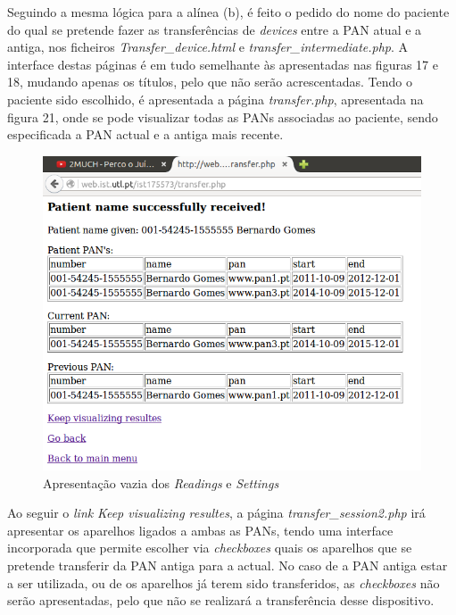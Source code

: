 \documentclass[a4paper]{article}
\begin{document}
\pagebreak
Seguindo a mesma lógica para a alínea (b), é feito o pedido do nome do paciente do qual se pretende fazer as transferências de \textit{devices} entre a PAN atual e a antiga, nos ficheiros \textit{Transfer\_device.html} e \textit{transfer\_intermediate.php}. A interface destas páginas é em tudo semelhante às apresentadas nas figuras 17 e 18, mudando apenas os títulos, pelo que não serão acrescentadas. Tendo o paciente sido escolhido, é apresentada a página \textit{transfer.php}, apresentada na figura 21, onde se pode visualizar todas as PANs associadas ao paciente, sendo especificada a PAN actual e a antiga mais recente.

\begin{figure}[ht!]
\centering
\includegraphics[scale=0.53]{transfer_php.png}
\caption{Apresentação vazia dos \textit{Readings} e \textit{Settings}}
\end{figure}
\vskip 9mm
Ao seguir o \textit{link} \textit{Keep visualizing resultes}, a página \textit{transfer\_session2.php} irá apresentar os aparelhos ligados a ambas as PANs, tendo uma interface incorporada que permite escolher via \textit{checkboxes} quais os aparelhos que se pretende transferir da PAN antiga para a actual. No caso de a PAN antiga estar a ser utilizada, ou de os aparelhos já terem sido transferidos, as \textit{checkboxes} não serão apresentadas, pelo que não se realizará a transferência desse dispositivo.
\end{document}

